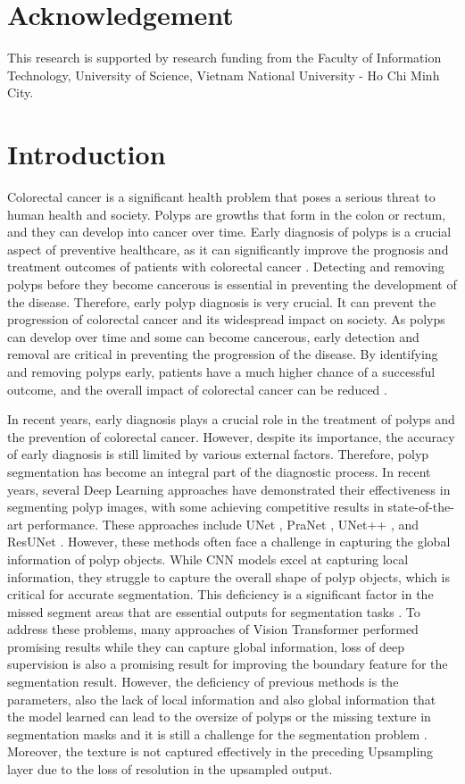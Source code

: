 \documentclass[conference]{IEEEtran}
\begin{document}
\section*{Acknowledgement}
This research is supported by research funding from the Faculty of Information Technology, University of Science, Vietnam National University - Ho Chi Minh City.
\section{Introduction}
Colorectal cancer is a significant health problem that poses a serious threat to human health and society. Polyps are growths that form in the colon or rectum, and they can develop into cancer over time. Early diagnosis of polyps is a crucial aspect of preventive healthcare, as it can significantly improve the prognosis and treatment outcomes of patients with colorectal cancer \cite{colectoral}. Detecting and removing polyps before they become cancerous is essential in preventing the development of the disease. Therefore, early polyp diagnosis is very crucial. It can prevent the progression of colorectal cancer and its widespread impact on society. As polyps can develop over time and some can become cancerous, early detection and removal are critical in preventing the progression of the disease. By identifying and removing polyps early, patients have a much higher chance of a successful outcome, and the overall impact of colorectal cancer can be reduced \cite{colectoral}.

In recent years, early diagnosis plays a crucial role in the treatment of polyps and the prevention of colorectal cancer. However, despite its importance, the accuracy of early diagnosis is still limited by various external factors\cite{lack-endoscopic}. Therefore, polyp segmentation has become an integral part of the diagnostic process. In recent years, several Deep Learning approaches have demonstrated their effectiveness in segmenting polyp images, with some achieving competitive results in state-of-the-art performance. These approaches include UNet \cite{unet}, PraNet \cite{pranet}, UNet++ \cite{unet++}, and ResUNet \cite{unet++}. However, these methods often face a challenge in capturing the global information of polyp objects. While CNN models excel at capturing local information, they struggle to capture the overall shape of polyp objects, which is critical for accurate segmentation. This deficiency is a significant factor in the missed segment areas that are essential outputs for segmentation tasks \cite{trinh2020hcmus}. To address these problems, many approaches of Vision Transformer \cite{metaformer} performed promising results while they can capture global information, loss of deep supervision is also a promising result for improving the boundary feature for the segmentation result. However, the deficiency of previous methods is the parameters, also the lack of local information and also global information \cite{transformer} that the model learned can lead to the oversize of polyps or the missing texture in segmentation masks and it is still a challenge for the segmentation problem \cite{pvt}.  Moreover, the texture is not captured effectively in the preceding Upsampling layer \cite{unet} due to the loss of resolution in the upsampled output.
\end{document}
